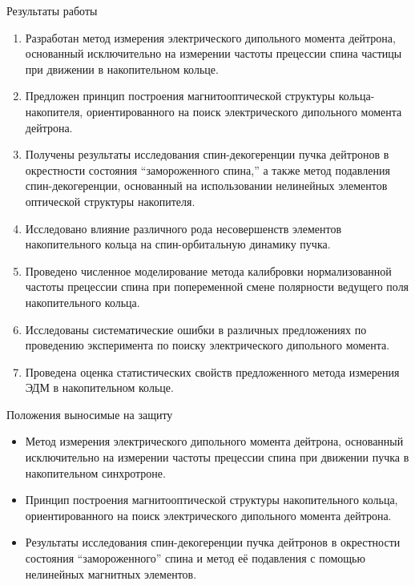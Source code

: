 \documentclass[14pt]{beamer}
\begin{document}
\begin{frame}{Результаты работы}
	\begin{enumerate}
		\item Разработан метод измерения электрического дипольного момента дейтрона, 
		основанный исключительно на измерении частоты прецессии спина частицы 
		при движении в накопительном кольце.
		\item Предложен принцип построения магнитооптической структуры кольца-накопителя, 
		ориентированного на поиск электрического дипольного момента дейтрона.
	\end{enumerate}
\end{frame}
\begin{frame}
	\begin{enumerate}\setcounter{enumi}{2}
		\item Получены результаты исследования спин-декогеренции пучка дейтронов в окрестности 
		состояния ``замороженного спина,'' а также метод подавления спин-декогеренции, основанный на использовании нелинейных элементов оптической структуры накопителя.
		\item Исследовано влияние различного рода несовершенств элементов накопительного кольца 
		на спин-орбитальную динамику пучка.
	\end{enumerate}
\end{frame}
\begin{frame}
	\begin{enumerate}\setcounter{enumi}{4}
		\item Проведено численное моделирование метода калибровки нормализованной частоты прецессии спина 
		при попеременной смене полярности ведущего поля накопительного кольца.
		\item Исследованы систематические ошибки в различных предложениях по проведению эксперимента 
		по поиску электрического дипольного момента.
		\item Проведена оценка статистических свойств предложенного метода измерения 
		ЭДМ в накопительном кольце.
	\end{enumerate}
\end{frame}
\begin{frame}{Положения выносимые на защиту}
	\begin{itemize}
		\item Метод измерения электрического дипольного момента дейтрона, основанный исключительно на измерении частоты прецессии спина при движении пучка в накопительном синхротроне.
		\item Принцип построения магнитооптической структуры накопительного кольца, ориентированного на поиск электрического дипольного момента дейтрона.
		\item Результаты исследования спин-декогеренции пучка дейтронов в окрестности состояния ``замороженного'' спина и метод её подавления с помощью нелинейных магнитных элементов.
	\end{itemize}
\end{frame}
\end{document}

